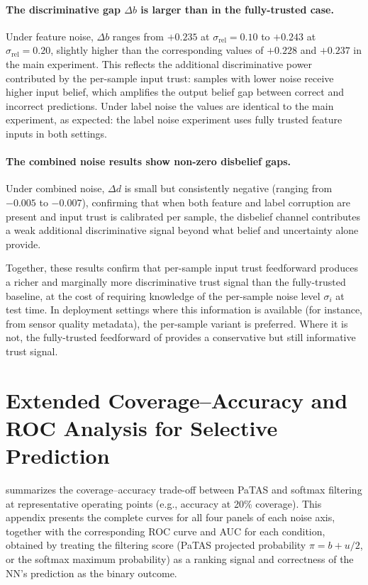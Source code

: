 \paragraph{The discriminative gap $\Delta b$ is larger than in the 
fully-trusted case.}
Under feature noise, $\Delta b$ ranges from $+0.235$ at 
$\sigma_{\text{rel}} = 0.10$ to $+0.243$ at $\sigma_{\text{rel}} = 0.20$, 
slightly higher than the corresponding values of $+0.228$ and $+0.237$ in 
the main experiment. This reflects the additional discriminative power 
contributed by the per-sample input trust: samples with lower noise receive 
higher input belief, which amplifies the output belief gap between correct 
and incorrect predictions. Under label noise the values are identical to 
the main experiment, as expected: the label noise experiment uses fully 
trusted feature inputs in both settings.

\paragraph{The combined noise results show non-zero disbelief gaps.}
Under combined noise, $\Delta d$ is small but consistently negative 
(ranging from $-0.005$ to $-0.007$), confirming that when both feature 
and label corruption are present and input trust is calibrated per sample, 
the disbelief channel contributes a weak additional discriminative signal 
beyond what belief and uncertainty alone provide.

Together, these results confirm that per-sample input trust feedforward 
produces a richer and marginally more discriminative trust signal than the 
fully-trusted baseline, at the cost of requiring knowledge of the per-sample 
noise level $\sigma_i$ at test time. In deployment settings where this 
information is available (for instance, from sensor quality metadata), 
the per-sample variant is preferred. Where it is not, the fully-trusted 
feedforward of  provides a conservative 
but still informative trust signal.


\section{Extended Coverage--Accuracy and ROC Analysis for Selective Prediction}
\label{app:coverage_roc}
 
 summarizes the coverage--accuracy
trade-off between \ac{PaTAS} and softmax filtering at representative
operating points (e.g., accuracy at 20\% coverage). This appendix
presents the complete curves for all four panels of each noise axis,
together with the corresponding ROC curve and AUC for each condition,
obtained by treating the filtering score (\ac{PaTAS} projected
probability $\pi = b + u/2$, or the softmax maximum probability) as a
ranking signal and correctness of the \ac{NN}'s prediction as the
binary outcome.
 
